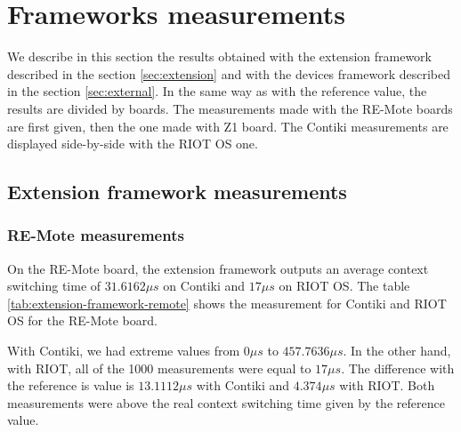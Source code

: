 \section{Frameworks measurements}

We describe in this section the results obtained with the extension framework described in the section \ref{sec:extension} and with the devices framework described in the section \ref{sec:external}.
In the same way as with the reference value, the results are divided by boards.
The measurements made with the RE-Mote boards are first given, then the one made with Z1 board.
The Contiki measurements are displayed side-by-side with the RIOT OS one.

\subsection{Extension framework measurements}

\subsubsection{RE-Mote measurements}
On the RE-Mote board, the extension framework outputs an average context switching time of $31.6162\mu s$ on Contiki and $17 \mu s$ on RIOT OS.
The table \ref{tab:extension-framework-remote} shows the measurement for Contiki and RIOT OS for the RE-Mote board.

With Contiki, we had extreme values from $0\mu s$ to $457.7636\mu s$.
In the other hand, with RIOT, all of the 1000 measurements were equal to $17\mu s$.
The difference with the reference is value is $13.1112 \mu s$ with Contiki and $4.374 \mu s$ with RIOT.
Both measurements were above the real context switching time given by the reference value.




